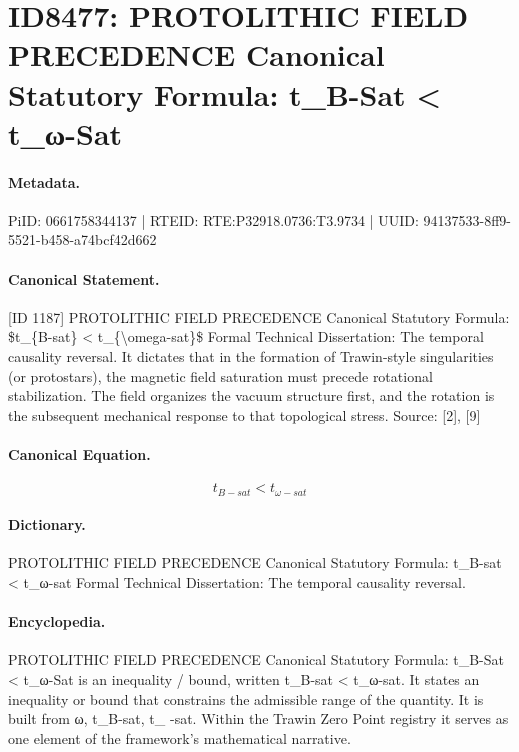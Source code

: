 \section*{ID8477: PROTOLITHIC FIELD PRECEDENCE Canonical Statutory Formula: t\_B-Sat < t\_ω-Sat}
\paragraph{Metadata.}
PiID: 0661758344137 | RTEID: RTE:P32918.0736:T3.9734 | UUID: 94137533-8ff9-5521-b458-a74bcf42d662

\paragraph{Canonical Statement.}
[ID 1187] PROTOLITHIC FIELD PRECEDENCE Canonical Statutory Formula: \$t\_\{B-sat\} < t\_\{\textbackslash{}omega-sat\}\$ Formal Technical Dissertation: The temporal causality reversal. It dictates that in the formation of Trawin-style singularities (or protostars), the magnetic field saturation must precede rotational stabilization. The field organizes the vacuum structure first, and the rotation is the subsequent mechanical response to that topological stress. Source: [2], [9]

\paragraph{Canonical Equation.}
\[
t_{B-sat} < t_{\omega-sat}
\]

\paragraph{Dictionary.}
PROTOLITHIC FIELD PRECEDENCE Canonical Statutory Formula: t\_B-sat < t\_ω-sat Formal Technical Dissertation: The temporal causality reversal.

\paragraph{Encyclopedia.}
PROTOLITHIC FIELD PRECEDENCE Canonical Statutory Formula: t\_B-Sat < t\_ω-Sat is an inequality / bound, written t\_B-sat < t\_ω-sat. It states an inequality or bound that constrains the admissible range of the quantity. It is built from ω, t\_B-sat, t\_ -sat. Within the Trawin Zero Point registry it serves as one element of the framework's mathematical narrative.
